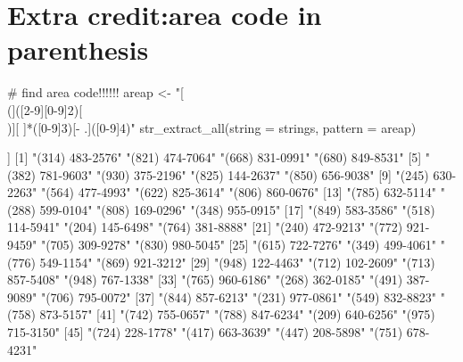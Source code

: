 \documentclass[11pt]{article}\usepackage[]{graphicx}\usepackage[]{color}
\begin{document}
\section{Extra credit:area code in parenthesis}
\begin{Schunk}
\begin{Sinput}
# find area code!!!!!!
areap <- "[\\(]([2-9][0-9]{2})[\\)][ ]*([0-9]{3})[- .]([0-9]{4})"
str_extract_all(string = strings, pattern = areap)
\end{Sinput}
\begin{Soutput}
[[1]]
 [1] "(314) 483-2576" "(821) 474-7064" "(668) 831-0991" "(680) 849-8531"
 [5] "(382) 781-9603" "(930) 375-2196" "(825) 144-2637" "(850) 656-9038"
 [9] "(245) 630-2263" "(564) 477-4993" "(622) 825-3614" "(806) 860-0676"
[13] "(785) 632-5114" "(288) 599-0104" "(808) 169-0296" "(348) 955-0915"
[17] "(849) 583-3586" "(518) 114-5941" "(204) 145-6498" "(764) 381-8888"
[21] "(240) 472-9213" "(772) 921-9459" "(705) 309-9278" "(830) 980-5045"
[25] "(615) 722-7276" "(349) 499-4061" "(776) 549-1154" "(869) 921-3212"
[29] "(948) 122-4463" "(712) 102-2609" "(713) 857-5408" "(948) 767-1338"
[33] "(765) 960-6186" "(268) 362-0185" "(491) 387-9089" "(706) 795-0072"
[37] "(844) 857-6213" "(231) 977-0861" "(549) 832-8823" "(758) 873-5157"
[41] "(742) 755-0657" "(788) 847-6234" "(209) 640-6256" "(975) 715-3150"
[45] "(724) 228-1778" "(417) 663-3639" "(447) 208-5898" "(751) 678-4231"
\end{Soutput}
\end{Schunk}
\end{document}
